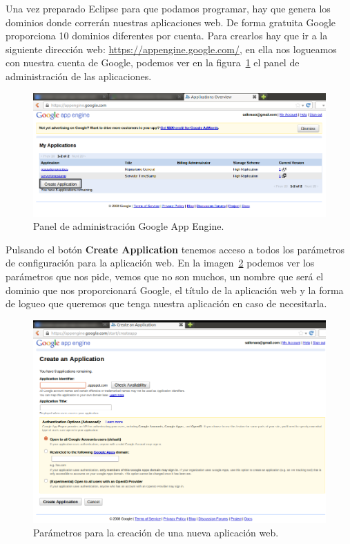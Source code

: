 Una vez preparado Eclipse para que podamos programar, hay que genera los dominios donde correrán nuestras aplicaciones web. De forma gratuita Google proporciona 10 dominios diferentes por cuenta. Para crearlos hay que ir a la siguiente dirección web: \url{https://appengine.google.com/}, en ella nos logueamos con nuestra cuenta de Google, podemos ver en la figura~\ref{fig:appEngine} el panel de administración de las aplicaciones.  

\begin{figure}[hbt]
  \centering
    \includegraphics[scale=0.6]{./ConfiguracionEclipse/imagenes/appEngine.png}
  \caption{Panel de administración Google App Engine.}
  \label{fig:appEngine}
\end{figure}

Pulsando el botón \textbf{Create Application} tenemos acceso a todos los parámetros de configuración para la aplicación web. En la imagen~\ref{fig:createGAE} podemos ver los parámetros que nos pide, vemos que no son muchos, un nombre que será el dominio que nos proporcionará Google, el título de la aplicación web y la forma de logueo que queremos que tenga nuestra aplicación en caso de necesitarla.

\begin{figure}[hbt]
  \centering
    \includegraphics[scale=0.5]{./ConfiguracionEclipse/imagenes/createGAE.png}
  \caption{Parámetros para la creación de una nueva aplicación web.}
  \label{fig:createGAE}
\end{figure}


